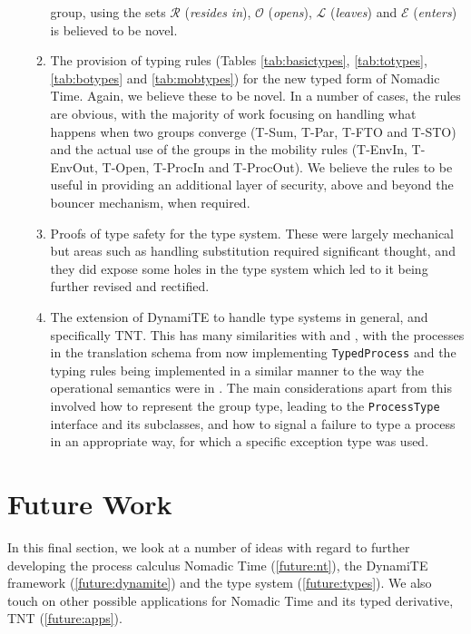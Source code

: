 \begin{enumerate}
\begin{enumerate}[\bfseries {C3.}1]
  group, using the sets $\mathscr{R}$ (\emph{resides in}),
  $\mathscr{O}$ (\emph{opens}), $\mathscr{L}$ (\emph{leaves}) and
  $\mathscr{E}$ (\emph{enters}) is believed to be novel.
\item The provision of typing rules (Tables \ref{tab:basictypes},
  \ref{tab:totypes}, \ref{tab:botypes} and \ref{tab:mobtypes}) for the
  new typed form of Nomadic Time.  Again, we believe these to be
  novel.  In a number of cases, the rules are obvious, with the
  majority of work focusing on handling what happens when two groups
  converge (T-Sum, T-Par, T-FTO and T-STO) and the actual use of the
  groups in the mobility rules (T-EnvIn, T-EnvOut, T-Open, T-ProcIn
  and T-ProcOut).  We believe the rules to be useful in providing an
  additional layer of security, above and beyond the bouncer
  mechanism, when required.
\item Proofs of type safety for the type system.  These were largely
  mechanical but areas such as handling substitution required
  significant thought, and they did expose some holes in the type
  system which led to it being further revised and rectified.
\item The extension of DynamiTE to handle type systems in general, and
  specifically TNT.  This has many similarities with  and
  , with the processes in the translation schema from
   now implementing \texttt{TypedProcess} and the typing
  rules being implemented in a similar manner to the way the
  operational semantics were in .  The main considerations
  apart from this involved how to represent the group type, leading to
  the \texttt{ProcessType} interface and its subclasses, and how to
  signal a failure to type a process in an appropriate way, for which
  a specific exception type was used.
\end{enumerate}
\end{enumerate}

\section{Future Work}
\label{futureworksect}

In this final section, we look at a number of ideas with regard to
further developing the process calculus Nomadic Time
(\ref{future:nt}), the DynamiTE framework (\ref{future:dynamite}) and
the type system (\ref{future:types}).  We also touch on other possible
applications for Nomadic Time and its typed derivative, TNT
(\ref{future:apps}).


